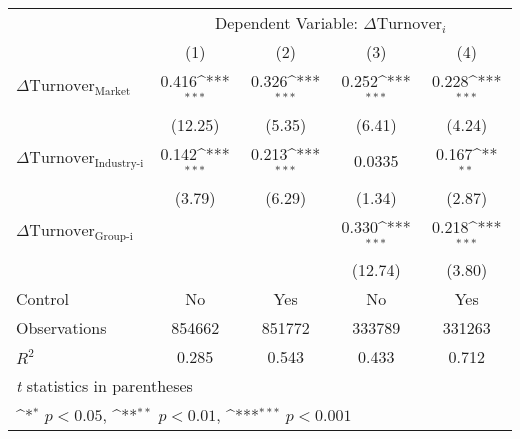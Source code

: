 {
\def\sym#1{\ifmmode^{#1}\else\(^{#1}\)\fi}
\begin{tabular}{l*{4}{c}}
\hline\hline
                    &\multicolumn{4}{c}{Dependent Variable: $\Delta \text{Turnover}_{i} $ }                 \\\cmidrule(lr){2-5}
                    &\multicolumn{1}{c}{(1)}         &\multicolumn{1}{c}{(2)}         &\multicolumn{1}{c}{(3)}         &\multicolumn{1}{c}{(4)}         \\
\hline
 $ \Delta \text{Turnover}_{\text{Market}} $ &       0.416\sym{***}&       0.326\sym{***}&       0.252\sym{***}&       0.228\sym{***}\\
                    &     (12.25)         &      (5.35)         &      (6.41)         &      (4.24)         \\
[1em]
 $ \Delta \text{Turnover}_{\text{Industry-i}} $ &       0.142\sym{***}&       0.213\sym{***}&      0.0335         &       0.167\sym{**} \\
                    &      (3.79)         &      (6.29)         &      (1.34)         &      (2.87)         \\
[1em]
 $ \Delta \text{Turnover}_{\text{Group-i}} $ &                     &                     &       0.330\sym{***}&       0.218\sym{***}\\
                    &                     &                     &     (12.74)         &      (3.80)         \\
\hline
Control             &          No         &         Yes         &          No         &         Yes         \\
Observations        &      854662         &      851772         &      333789         &      331263         \\
$ R^2 $             &       0.285         &       0.543         &       0.433         &       0.712         \\
\hline\hline
\multicolumn{5}{l}{\footnotesize \textit{t} statistics in parentheses}\\
\multicolumn{5}{l}{\footnotesize \sym{*} \(p<0.05\), \sym{**} \(p<0.01\), \sym{***} \(p<0.001\)}\\
\end{tabular}
}
